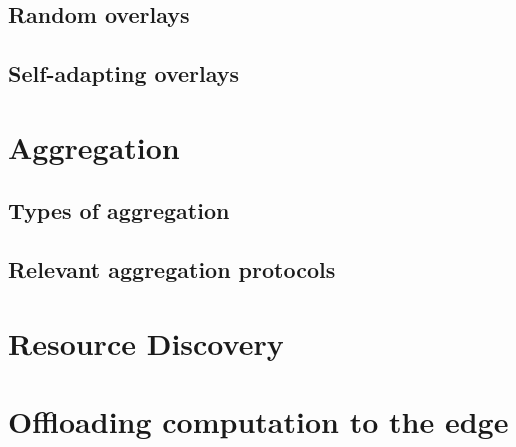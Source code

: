 \subsection{Random overlays}

\subsection{Self-adapting overlays}

\section{Aggregation} 
\label{sec:aggregation}

\subsection{Types of aggregation}

\subsection{Relevant aggregation protocols}

\section{Resource Discovery} 
\label{sec:res_discvovery}

\section{Offloading computation to the edge} 
\label{sec:offloading_comp}